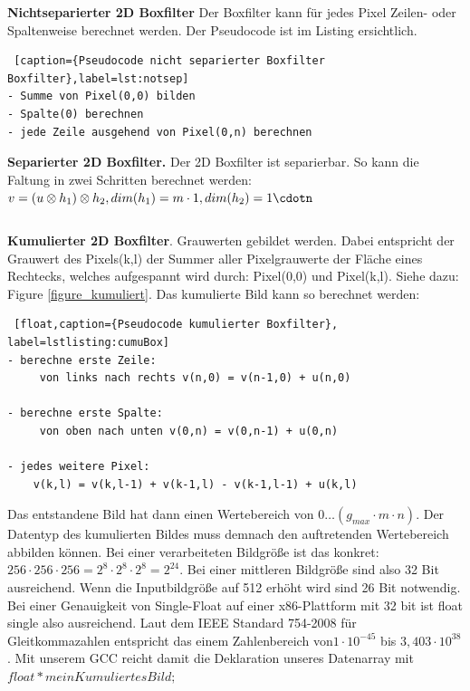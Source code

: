 \documentclass[a4paper,12pt]{article}
\begin{document}
\textbf{Nichtseparierter 2D Boxfilter} 
Der Boxfilter kann für jedes Pixel Zeilen- oder Spaltenweise berechnet
werden. Der Pseudocode ist im Listing ersichtlich.
 
\begin{lstlisting} [caption={Pseudocode nicht separierter Boxfilter
Boxfilter},label=lst:notsep] 
- Summe von Pixel(0,0) bilden
- Spalte(0) berechnen
- jede Zeile ausgehend von Pixel(0,n) berechnen
\end{lstlisting}



\textbf{Separierter 2D Boxfilter.} Der 2D Boxfilter ist separierbar. So kann die
Faltung in zwei Schritten berechnet werden: \\
$v = \left ( u \otimes h_{1} \right ) \otimes h_{2},
dim(h_{1})=m\cdot1,dim(h_{2})=1\cdotn$




\begin{verbatim}
\end{verbatim}

 


\textbf{Kumulierter 2D Boxfilter}.
Grauwerten gebildet werden. Dabei entspricht der Grauwert des Pixels(k,l) der Summer aller
Pixelgrauwerte der Fläche eines Rechtecks, welches aufgespannt wird durch:
Pixel(0,0) und Pixel(k,l). Siehe dazu: Figure \ref{figure_kumuliert}.
Das kumulierte Bild kann so berechnet werden:

\begin{lstlisting} [float,caption={Pseudocode kumulierter Boxfilter},
label=lstlisting:cumuBox]
- berechne erste Zeile:
	 von links nach rechts v(n,0) = v(n-1,0) + u(n,0)
	 
- berechne erste Spalte:
	 von oben nach unten v(0,n) = v(0,n-1) + u(0,n)
	
- jedes weitere Pixel:
	v(k,l) = v(k,l-1) + v(k-1,l) - v(k-1,l-1) + u(k,l)
\end{lstlisting}


Das entstandene Bild hat dann einen Wertebereich von 
$0 \ldots (g_{max} \cdot m \cdot n)$. Der Datentyp des kumulierten Bildes muss
demnach den auftretenden Wertebereich abbilden können. Bei einer verarbeiteten Bildgröße ist
das konkret: $256 \cdot 256 \cdot 256 = 2^{8} \cdot 2^{8} \cdot 2^{8} = 2^{24}$.
Bei einer mittleren Bildgröße sind also 32 Bit ausreichend. Wenn die Inputbildgröße auf 512
erhöht wird sind 26 Bit notwendig. Bei einer Genauigkeit von Single-Float auf
einer x86-Plattform mit 32 bit ist float single also ausreichend. Laut dem IEEE
Standard 754-2008 für Gleitkommazahlen \cite{ieee754} entspricht das einem
Zahlenbereich von$1 \cdot 10^{-45}$ bis $3,403 \cdot 10^{38}$. Mit unserem GCC
reicht damit die Deklaration unseres Datenarray mit\\
$float* meinKumuliertesBild;$\\
\end{document}
